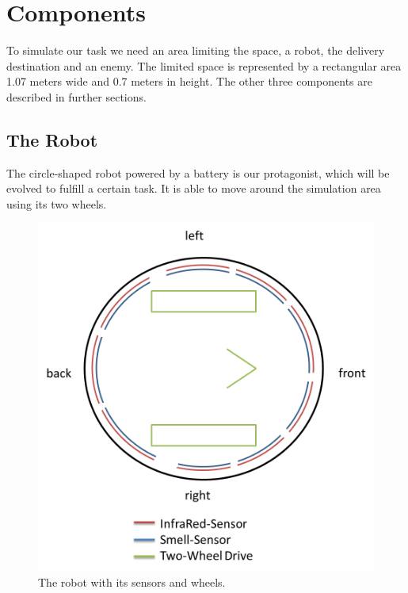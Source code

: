 \documentclass[12pt,fleqn,a4paper]{article}
\begin{document}
\section{Components}
To simulate our task we need an area limiting the space, a robot, the delivery destination and an enemy. The limited space is represented by a rectangular area 1.07 meters wide and 0.7 meters in height. The other three components are described in further sections.

\subsection{The Robot}
The circle-shaped robot powered by a battery is our protagonist, which will be evolved to fulfill a certain task. It is able to move around the simulation area using its two wheels.

\begin{figure}[h]
\centering
\includegraphics[scale=0.333]{img/robot_neu.png}
\caption{The robot with its sensors and wheels.}
\label{fig:robot}
\end{figure}
\end{document}
